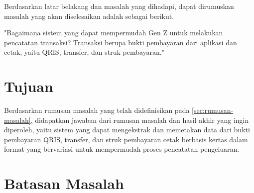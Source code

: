 Berdasarkan latar belakang dan masalah yang dihadapi, dapat dirumuskan masalah yang akan diselesaikan adalah sebagai berikut.

\begin{center}
	"Bagaimana sistem yang dapat mempermudah Gen Z untuk melakukan pencatatan transaksi? Transaksi berupa bukti pembayaran dari aplikasi dan cetak, yaitu QRIS, transfer, dan struk pembayaran."
\end{center}

\section{Tujuan}
\label{sec:tujuan}

Berdasarkan rumusan masalah yang telah didefinisikan pada \autoref{sec:rumusan-masalah}, didapatkan jawaban dari rumusan masalah dan hasil akhir yang ingin diperoleh, yaitu sistem yang dapat mengekstrak dan memetakan data dari bukti pembayaran QRIS, transfer, dan struk pembayaran cetak berbasis kertas dalam format yang bervariasi untuk mempermudah proses pencatatan pengeluaran.

\section{Batasan Masalah}
\label{sec:batasan-masalah}

